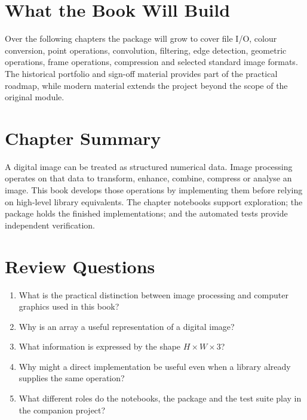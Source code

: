 \section{What the Book Will Build}

Over the following chapters the \pyimage{} package will grow to cover file I/O,
colour conversion, point operations, convolution, filtering, edge detection,
geometric operations, frame operations, compression and selected standard image
formats. The historical portfolio and sign-off material provides part of the
practical roadmap, while modern material extends the project beyond the scope
of the original module.

\section{Chapter Summary}

A digital image can be treated as structured numerical data. Image processing
operates on that data to transform, enhance, combine, compress or analyse an
image. This book develops those operations by implementing them before relying
on high-level library equivalents. The chapter notebooks support exploration;
the \pyimage{} package holds the finished implementations; and the automated
tests provide independent verification.

\section{Review Questions}

\begin{enumerate}
    \item What is the practical distinction between image processing and
          computer graphics used in this book?
    \item Why is an array a useful representation of a digital image?
    \item What information is expressed by the shape $H \times W \times 3$?
    \item Why might a direct implementation be useful even when a library
          already supplies the same operation?
    \item What different roles do the notebooks, the \pyimage{} package and the
          test suite play in the companion project?
\end{enumerate}
